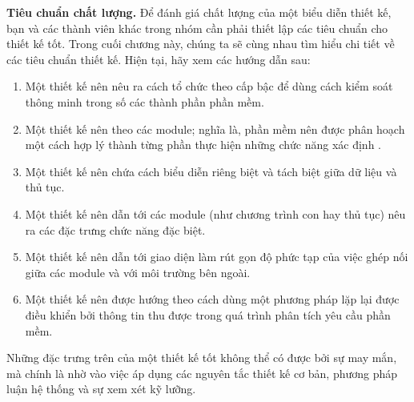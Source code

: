 \documentclass[./../SoftwareEngineering.tex]{subfiles}
\begin{document}
	\textbf{Tiêu chuẩn chất lượng.} Để đánh giá chất lượng của một biểu diễn thiết kế, bạn và các thành viên khác trong nhóm cần phải thiết lập các tiêu chuẩn cho thiết kế tốt. Trong cuối chương này, chúng ta sẽ cùng nhau tìm hiểu chi tiết về các tiêu chuẩn thiết kế. Hiện tại, hãy xem các hướng dẫn sau:
	\begin{enumerate}
		\item Một thiết kế nên nêu ra cách tổ chức theo cấp bậc để dùng cách kiểm soát thông minh trong số các thành phần phần mềm.
		\item Một thiết kế nên theo các module; nghĩa là, phần mềm nên được phân hoạch một cách hợp lý thành từng phần thực hiện những chức năng xác định . 
		\item Một thiết kế nên chứa cách biểu diễn riêng biệt và tách biệt giữa dữ liệu và thủ tục.
		\item Một thiết kế nên dẫn tới các module (như chương trình con hay thủ tục) nêu ra các đặc trưng chức năng đặc biệt. 
		\item Một thiết kế nên dẫn tới giao diện làm rút gọn độ phức tạp của việc ghép nối giữa các module và với môi trường bên ngoài. 
		\item Một thiết kế nên được hướng theo cách dùng một phương pháp lặp lại được điều khiển bởi thông tin thu được trong quá trình phân tích yêu cầu phần mềm. 
		
	\end{enumerate}
	Những đặc trưng trên của một thiết kế tốt không thể có được bởi sự may mắn, mà chính là nhờ vào việc áp dụng các nguyên tắc thiết kế cơ bản, phương pháp luận hệ thống và sự xem xét kỹ lưỡng.
	
\end{document}
